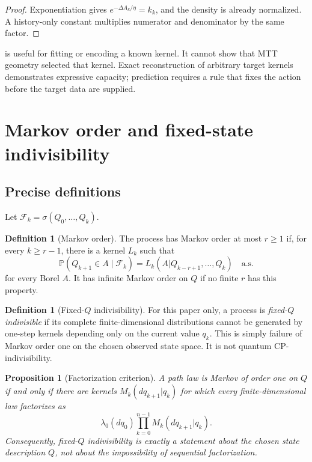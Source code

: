 \documentclass[11pt]{article}
\newtheorem{proposition}[theorem]{Proposition}
\theoremstyle{definition}
\newtheorem{definition}[theorem]{Definition}
\theoremstyle{remark}
\newcommand{\PP}{\mathbb{P}}
\newcommand{\cF}{\mathcal{F}}
\begin{document}
\begin{proof}
Exponentiation gives \(e^{-\Delta A_k/\eta}=k_k\), and the density is already
normalized.  A history-only constant multiplies numerator and denominator by
the same factor.
\end{proof}

 is useful for fitting or encoding a known kernel.  It cannot
show that MTT geometry selected that kernel.  Exact reconstruction of arbitrary
target kernels demonstrates expressive capacity; prediction requires a rule
that fixes the action before the target data are supplied.

\section{Markov order and fixed-state indivisibility}

\subsection{Precise definitions}

Let \(\cF_k=\sigma(Q_0,\ldots,Q_k)\).

\begin{definition}[Markov order]\label{def:markov-order}
The process has Markov order at most \(r\geq 1\) if, for every \(k\geq r-1\),
there is a kernel \(L_k\) such that
\[
\PP(Q_{k+1}\in A\mid\cF_k)
=L_k(A|Q_{k-r+1},\ldots,Q_k)
\quad\text{a.s.}
\]
for every Borel \(A\).  It has infinite Markov order on \(Q\) if no finite
\(r\) has this property.
\end{definition}

\begin{definition}[Fixed-\(Q\) indivisibility]\label{def:q-indivisible}
For this paper only, a process is \emph{fixed-\(Q\) indivisible} if its complete
finite-dimensional distributions cannot be generated by one-step kernels
depending only on the current value \(q_k\).  This is simply failure of Markov
order one on the chosen observed state space.  It is not quantum
CP-indivisibility.
\end{definition}

\begin{proposition}[Factorization criterion]\label{prop:factorization}
A path law is Markov of order one on \(Q\) if and only if there are kernels
\(M_k(dq_{k+1}|q_k)\) for which every finite-dimensional law factorizes as
\[
\lambda_0(dq_0)\prod_{k=0}^{n-1}M_k(dq_{k+1}|q_k).
\]
Consequently, fixed-\(Q\) indivisibility is exactly a statement about the
chosen state description \(Q\), not about the impossibility of sequential
factorization.
\end{proposition}
\end{document}
